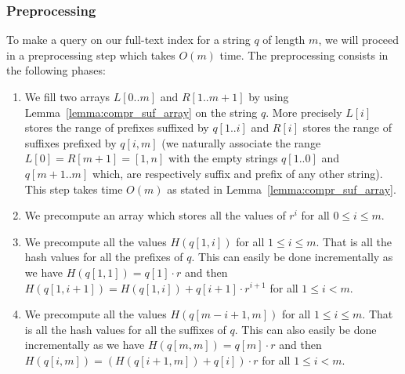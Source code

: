 \documentclass{article}
\newcommand{\?}{\mskip1.5mu}
\begin{document}
\subsubsection{Preprocessing}
To make a query on our full-text index for a string $q$ of length $m$, we will proceed in a preprocessing step which takes $O(m)$ time. The preprocessing consists in the following phases: 
\begin{enumerate}
\item We fill two arrays $L[0..m]$ and $R[1..m+1]$ by using Lemma~\ref{lemma:compr_suf_array} on the string $q$. More precisely $L[i]$ stores the range of prefixes suffixed by $q[1..i]$ and $R[i]$ stores the range of suffixes prefixed by $q[i,m]$ (we naturally associate the range $L[0]=R[m+1]=[1,n]$ with the empty strings $q[1..0]$ and $q[m+1..m]$ which, are respectively suffix and prefix of any other string). This step takes time $O(m)$ as stated in Lemma~\ref{lemma:compr_suf_array}. 
\item We precompute an array which stores all the values of $r^{i}$ for all $0\leq i\leq m$.
\item We precompute all the values $H(q[1,i])$ for all $1\leq i\leq m$. That is all the hash values for all the prefixes of $q$. This can easily be done incrementally as we have $H(q[1,1])=q[1]\cdot r$ and then $H(q[1,i+1])=H(q[1,i])+q[i+1]\cdot r^{i+1}$ for all $1\leq i<m$. 
\item We precompute all the values $H(q[m-i+1,m])$ for all $1\leq i\leq m$. That is all the hash values for all the suffixes of $q$. This can also easily be done incrementally as we have $H(q[m,m])=q[m]\cdot r$ and then $H(q[i,m])=(H(q[i+1,m])+q[i])\cdot r$ for all $1\leq i<m$. 
\end{enumerate}
\end{document}
